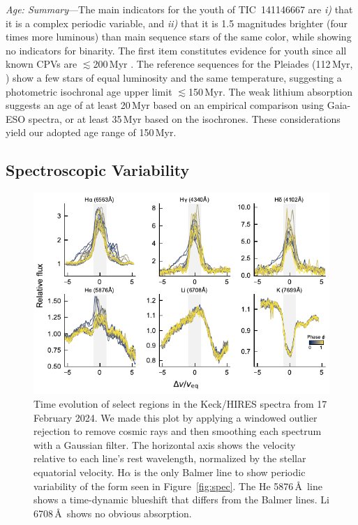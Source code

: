 \documentclass{nature3}
\begin{document}
\begin{methods}
{\it Age: Summary}---The main indicators for the youth of
TIC~141146667 are {\it i)} that it is a complex periodic variable, and
{\it ii)} that it is 1.5 magnitudes brighter (four times more
luminous) than main sequence stars of the same color, while showing no
indicators for binarity.  The first item constitutes evidence for
youth since all known CPVs are $\lesssim$200\,Myr \cite{Bouma2024}.
The reference sequences for the Pleiades (112\,Myr, \cite{Dahm2015})
show a few stars of equal luminosity and the same temperature,
suggesting a photometric isochronal age upper limit
$\lesssim$150\,Myr.  The weak lithium absorption suggests an age of at
least 20\,Myr based on an empirical comparison using Gaia-ESO spectra,
or at least 35\,Myr based on the \cite{Feiden2016} isochrones.  These
considerations yield our adopted age range of 150\,Myr.




\subsection{Spectroscopic Variability}\phantom{+}
\label{subsec:specvar}

\begin{figure}[!t]
  \centering
  \includegraphics[width=\textwidth]{figures/sf5.pdf}
  \caption{Time evolution of select regions in the Keck/HIRES
  spectra from 17 February 2024.
  We made this plot by applying a windowed outlier rejection to remove
  cosmic rays and then smoothing each spectrum with a Gaussian filter.
  The horizontal axis shows the velocity relative to each
  line's rest wavelength, normalized by the stellar equatorial
  velocity.  
  H$\alpha$ is the only Balmer line to show periodic variability of
  the form seen in Figure~\ref{fig:spec}.
  The He 5876\,\AA\ line shows a time-dynamic blueshift that 
  differs from the Balmer lines.
  Li 6708\,\AA\ shows no obvious absorption.
  }
  \label{fig:hirescuts}
\end{figure}


\end{methods}
\end{document}
